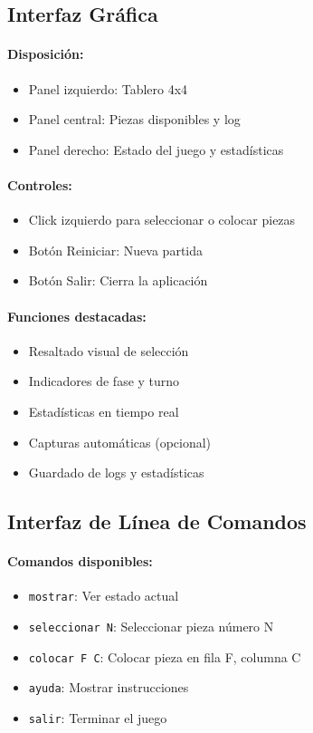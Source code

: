 \documentclass[conference]{IEEEtran}
\begin{document}
\subsection{Interfaz Gráfica}

\paragraph{Disposición:}
\begin{itemize}
	\item Panel izquierdo: Tablero 4x4
	\item Panel central: Piezas disponibles y log
	\item Panel derecho: Estado del juego y estadísticas
\end{itemize}

\paragraph{Controles:}
\begin{itemize}
	\item Click izquierdo para seleccionar o colocar piezas
	\item Botón Reiniciar: Nueva partida
	\item Botón Salir: Cierra la aplicación
\end{itemize}

\paragraph{Funciones destacadas:}
\begin{itemize}
	\item Resaltado visual de selección
	\item Indicadores de fase y turno
	\item Estadísticas en tiempo real
	\item Capturas automáticas (opcional)
	\item Guardado de logs y estadísticas
\end{itemize}

\subsection{Interfaz de Línea de Comandos}

\paragraph{Comandos disponibles:}
\begin{itemize}
	\item \texttt{mostrar}: Ver estado actual
	\item \texttt{seleccionar N}: Seleccionar pieza número N
	\item \texttt{colocar F C}: Colocar pieza en fila F, columna C
	\item \texttt{ayuda}: Mostrar instrucciones
	\item \texttt{salir}: Terminar el juego
\end{itemize}
\end{document}

